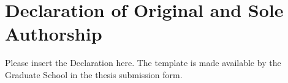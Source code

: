 \chapter*{Declaration of Original and Sole Authorship}

Please insert the Declaration here. The template is made available by the Graduate School in the thesis submission form.
